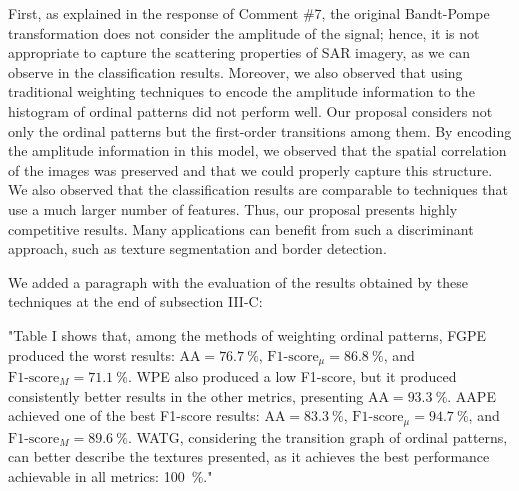 \documentclass[journal,onecolumn,draftcls,11pt]{IEEEtran}
\begin{document}
First, as explained in the response of Comment \#7, the original Bandt-Pompe transformation does not consider the amplitude of the signal; hence, it is not appropriate to capture the scattering properties of SAR imagery, as we can observe in the classification results. Moreover, we also observed that using traditional weighting techniques to encode the amplitude information to the histogram of ordinal patterns did not perform well. 
Our proposal considers not only the ordinal patterns but the first-order transitions among them. By encoding the amplitude information in this model, we observed that the spatial correlation of the images was preserved and that we could properly capture this structure. 
We also observed that the classification results are comparable to techniques that use a much larger number of features. 
Thus, our proposal presents highly competitive results. 
Many applications can benefit from such a discriminant approach, such as texture segmentation and border detection.

We added a paragraph with the evaluation of the results obtained by these techniques at the end of subsection III-C:

\vspace{.4cm}
\begin{tcolorbox}[colback=white,colframe=black,title=Change \#13]
	
	
	"Table I shows that, among the methods of weighting ordinal patterns, FGPE produced the worst results: $\text{AA} = \SI{76.7}{\percent}$, $\text{F1-score}_\mu = \SI{86.8}{\percent}$, and $\text{F1-score}_M = \SI{71.1}{\percent}$.
    WPE also produced a low F1-score, but it produced consistently better results in the other metrics, presenting $\text{AA} = \SI{93.3}{\percent}$.
    AAPE achieved one of the best F1-score results: $\text{AA} = \SI{83.3}{\percent}$, $\text{F1-score}_\mu = \SI{94.7}{\percent}$, and $\text{F1-score}_M = \SI{89.6}{\percent}$.
    WATG, considering the transition graph of ordinal patterns, can better describe the textures presented, as it achieves the best performance achievable in all metrics: \SI{100}{\percent}."	
\end{tcolorbox}
\end{document}
